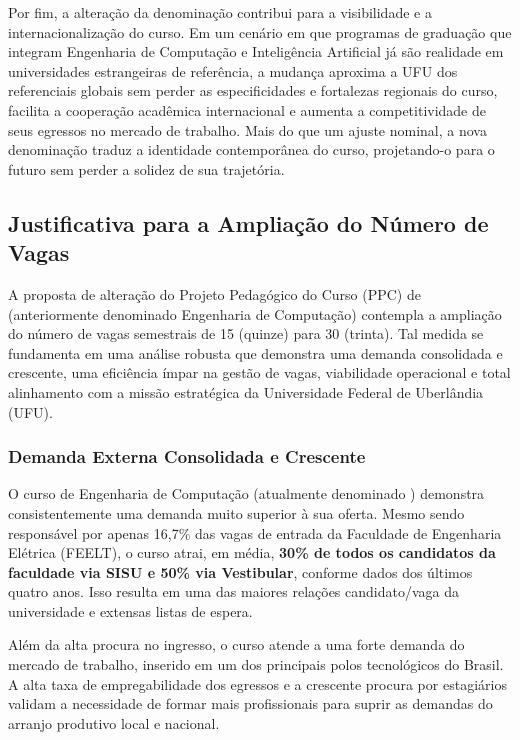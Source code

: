 Por fim, a alteração da denominação contribui para a visibilidade e a internacionalização do curso. Em um cenário em que programas de graduação que integram Engenharia de Computação e Inteligência Artificial já são realidade em universidades estrangeiras de referência, a mudança aproxima a UFU dos referenciais globais sem perder as especificidades e fortalezas regionais do curso, facilita a cooperação acadêmica internacional e aumenta a competitividade de seus egressos no mercado de trabalho. Mais do que um ajuste nominal, a nova denominação traduz a identidade contemporânea do curso, projetando-o para o futuro sem perder a solidez de sua trajetória.

\subsection{Justificativa para a Ampliação do Número de Vagas}

A proposta de alteração do Projeto Pedagógico do Curso (PPC) de \ppccurso (anteriormente denominado Engenharia de Computação) contempla a ampliação do número de vagas semestrais de 15 (quinze) para 30 (trinta). Tal medida se fundamenta em uma análise robusta que demonstra uma demanda consolidada e crescente, uma eficiência ímpar na gestão de vagas, viabilidade operacional e total alinhamento com a missão estratégica da Universidade Federal de Uberlândia (UFU).

\subsubsection*{Demanda Externa Consolidada e Crescente}

O curso de Engenharia de Computação (atualmente denominado \ppccurso) demonstra consistentemente uma demanda muito superior à sua oferta. Mesmo sendo responsável por apenas 16,7\% das vagas de entrada da Faculdade de Engenharia Elétrica (FEELT), o curso atrai, em média, \textbf{30\% de todos os candidatos da faculdade via SISU e 50\% via Vestibular}, conforme dados dos últimos quatro anos. Isso resulta em uma das maiores relações candidato/vaga da universidade e extensas listas de espera.

Além da alta procura no ingresso, o curso atende a uma forte demanda do mercado de trabalho, inserido em um dos principais polos tecnológicos do Brasil. A alta taxa de empregabilidade dos egressos e a crescente procura por estagiários validam a necessidade de formar mais profissionais para suprir as demandas do arranjo produtivo local e nacional.

